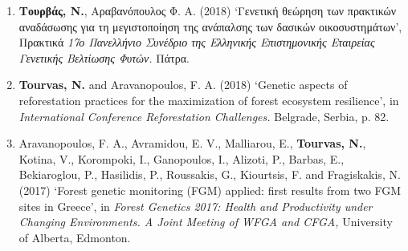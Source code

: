 \documentclass[12pt,]{scrartcl}
\begin{document}
\begin{enumerate}

\item {\textbf{Τουρβάς, Ν.}, Αραβανόπουλος Φ. Α. (2018) ‘Γενετική θεώρηση των πρακτικών αναδάσωσης για τη μεγιστοποίηση της ανάπαλσης των δασικών οικοσυστημάτων’, Πρακτικά \textit{17ο Πανελλήνιο Συνέδριο της Ελληνικής Επιστημονικής Εταιρείας Γενετικής Βελτίωσης Φυτών.} Πάτρα.}

\leftskip-0.07in  
\item {\textbf{Tourvas, N.} and Aravanopoulos, F. A. (2018) ‘Genetic aspects of reforestation practices for the maximization of forest ecosystem resilience’, in \textit{International Conference Reforestation Challenges.} Belgrade, Serbia, p. 82.}

\leftskip-0.07in  


\leftskip-0.07in  
\item {Aravanopoulos, F. A., Avramidou, E. V., Malliarou, E., \textbf{Tourvas, N.}, Kotina, V., Korompoki, I., Ganopoulos, I., Alizoti, P., Barbas, E., Bekiaroglou, P., Hasilidis, P., Roussakis, G., Kiourtsis, F. and Fragiskakis, N. (2017) ‘Forest genetic monitoring (FGM) applied: first results from two FGM sites in Greece’, in \textit{Forest Genetics 2017: Health and Productivity under Changing Environments. A Joint Meeting of WFGA and CFGA,} University of Alberta, Edmonton.}


\end{enumerate}
\end{document}
